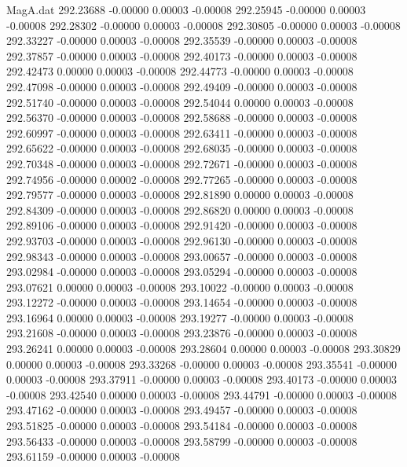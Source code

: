 \begin{filecontents}{MagA.dat}
 292.23688   -0.00000    0.00003   -0.00008
 292.25945   -0.00000    0.00003   -0.00008
 292.28302   -0.00000    0.00003   -0.00008
 292.30805   -0.00000    0.00003   -0.00008
 292.33227   -0.00000    0.00003   -0.00008
 292.35539   -0.00000    0.00003   -0.00008
 292.37857   -0.00000    0.00003   -0.00008
 292.40173   -0.00000    0.00003   -0.00008
 292.42473    0.00000    0.00003   -0.00008
 292.44773   -0.00000    0.00003   -0.00008
 292.47098   -0.00000    0.00003   -0.00008
 292.49409   -0.00000    0.00003   -0.00008
 292.51740   -0.00000    0.00003   -0.00008
 292.54044    0.00000    0.00003   -0.00008
 292.56370   -0.00000    0.00003   -0.00008
 292.58688   -0.00000    0.00003   -0.00008
 292.60997   -0.00000    0.00003   -0.00008
 292.63411   -0.00000    0.00003   -0.00008
 292.65622   -0.00000    0.00003   -0.00008
 292.68035   -0.00000    0.00003   -0.00008
 292.70348   -0.00000    0.00003   -0.00008
 292.72671   -0.00000    0.00003   -0.00008
 292.74956   -0.00000    0.00002   -0.00008
 292.77265   -0.00000    0.00003   -0.00008
 292.79577   -0.00000    0.00003   -0.00008
 292.81890    0.00000    0.00003   -0.00008
 292.84309   -0.00000    0.00003   -0.00008
 292.86820    0.00000    0.00003   -0.00008
 292.89106   -0.00000    0.00003   -0.00008
 292.91420   -0.00000    0.00003   -0.00008
 292.93703   -0.00000    0.00003   -0.00008
 292.96130   -0.00000    0.00003   -0.00008
 292.98343   -0.00000    0.00003   -0.00008
 293.00657   -0.00000    0.00003   -0.00008
 293.02984   -0.00000    0.00003   -0.00008
 293.05294   -0.00000    0.00003   -0.00008
 293.07621    0.00000    0.00003   -0.00008
 293.10022   -0.00000    0.00003   -0.00008
 293.12272   -0.00000    0.00003   -0.00008
 293.14654   -0.00000    0.00003   -0.00008
 293.16964    0.00000    0.00003   -0.00008
 293.19277   -0.00000    0.00003   -0.00008
 293.21608   -0.00000    0.00003   -0.00008
 293.23876   -0.00000    0.00003   -0.00008
 293.26241    0.00000    0.00003   -0.00008
 293.28604    0.00000    0.00003   -0.00008
 293.30829    0.00000    0.00003   -0.00008
 293.33268   -0.00000    0.00003   -0.00008
 293.35541   -0.00000    0.00003   -0.00008
 293.37911   -0.00000    0.00003   -0.00008
 293.40173   -0.00000    0.00003   -0.00008
 293.42540    0.00000    0.00003   -0.00008
 293.44791   -0.00000    0.00003   -0.00008
 293.47162   -0.00000    0.00003   -0.00008
 293.49457   -0.00000    0.00003   -0.00008
 293.51825   -0.00000    0.00003   -0.00008
 293.54184   -0.00000    0.00003   -0.00008
 293.56433   -0.00000    0.00003   -0.00008
 293.58799   -0.00000    0.00003   -0.00008
 293.61159   -0.00000    0.00003   -0.00008

\end{filecontents}
